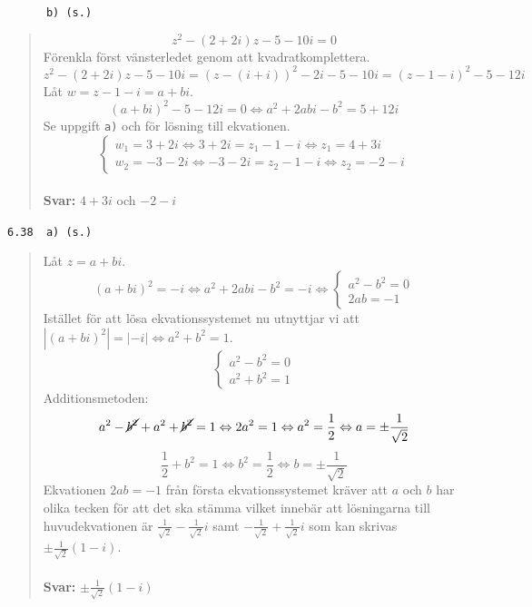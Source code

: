 \documentclass[a4paper]{article}
\newcommand{\tskcol}[1]{\textcolor{tskcol}{#1}}
\begin{document}
	\pagebreak
	\texttt{\tskcol{~~~~~~b) (s.)}}
	\begin{quotation}
		\noindent
		\[z^2-(2+2i)z-5-10i=0\]
		Förenkla först vänsterledet genom att kvadratkomplettera.
		\[z^2-(2+2i)z-5-10i=(z-(i+i))^2-2i-5-10i=(z-1-i)^2-5-12i\]
		Låt $w=z-1-i=a+bi$.
		\[(a+bi)^2-5-12i=0 \Leftrightarrow
		a^2+2abi-b^2=5+12i\]
		Se uppgift \texttt{\tskcol{a)}} och för lösning till ekvationen.
		\[\begin{cases}
		w_1=3+2i \Leftrightarrow 3+2i=z_1-1-i \Leftrightarrow z_1=4+3i \\
		w_2=-3-2i \Leftrightarrow -3-2i=z_2-1-i \Leftrightarrow z_2=-2-i
		\end{cases}\]
		\\
		\textbf{Svar:} $4+3i$ och $-2-i$
	\end{quotation}
	
	\texttt{\tskcol{6.38~~a) (s.)}}
	\begin{quotation}
		\noindent
		Låt $z=a+bi$.
		\[(a+bi)^2=-i \Leftrightarrow
		a^2+2abi-b^2=-i \Leftrightarrow
		\begin{cases}
		a^2-b^2=0 \\
		2ab=-1
		\end{cases}\]
		Istället för att lösa ekvationssystemet nu utnyttjar vi  att $|(a+bi)^2|=|-i| \Leftrightarrow a^2+b^2=1$.
		\[\begin{cases}
		a^2-b^2 = 0 \\
		a^2+b^2 = 1
		\end{cases}\]
		Additionsmetoden:
		\[a^2-\cancel{b^2}+a^2+\cancel{b^2} = 1 \Leftrightarrow
		2a^2=1 \Leftrightarrow
		a^2=\frac{1}{2} \Leftrightarrow
		a=\pm\frac{1}{\sqrt{2}}\]
		\[\frac{1}{2}+b^2=1 \Leftrightarrow
		b^2=\frac{1}{2} \Leftrightarrow
		b=\pm \frac{1}{\sqrt{2}}\]
		Ekvationen $2ab=-1$ från första ekvationssystemet kräver att $a$ och $b$ har olika tecken för att det ska stämma vilket innebär att lösningarna till huvudekvationen är $\frac{1}{\sqrt{2}}-\frac{1}{\sqrt{2}}i$ samt $-\frac{1}{\sqrt{2}}+\frac{1}{\sqrt{2}}i$ som kan skrivas $\pm\frac{1}{\sqrt{2}}(1-i)$.
		\\ \\
		\textbf{Svar:} $\pm\frac{1}{\sqrt{2}}(1-i)$
	\end{quotation}
	
\end{document}
